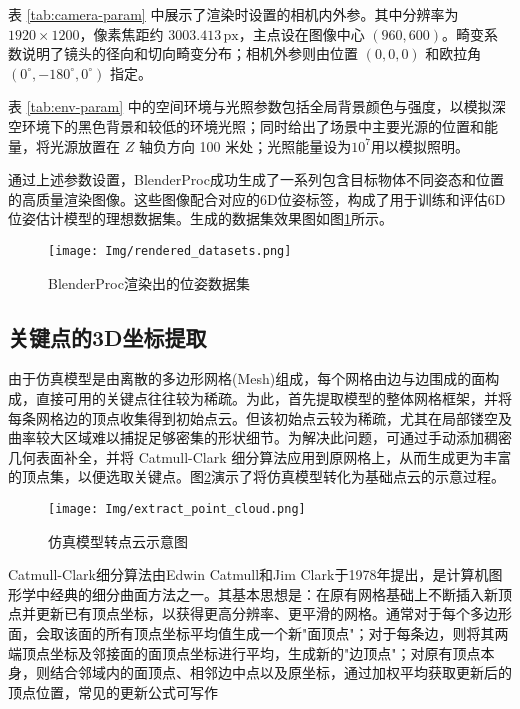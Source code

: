 表 \ref{tab:camera-param} 中展示了渲染时设置的相机内外参。其中分辨率为 $1920 \times 1200$，像素焦距约 $3003.413\,\mathrm{px}$，主点设在图像中心 $(960, 600)$。畸变系数说明了镜头的径向和切向畸变分布；相机外参则由位置 $(0,0,0)$ 和欧拉角 $(0^\circ,-180^\circ,0^\circ)$ 指定。

表 \ref{tab:env-param} 中的空间环境与光照参数包括全局背景颜色与强度，以模拟深空环境下的黑色背景和较低的环境光照；同时给出了场景中主要光源的位置和能量，将光源放置在 $Z$ 轴负方向 100 米处；光照能量设为$10^7$用以模拟照明。

通过上述参数设置，BlenderProc成功生成了一系列包含目标物体不同姿态和位置的高质量渲染图像。这些图像配合对应的6D位姿标签，构成了用于训练和评估6D位姿估计模型的理想数据集。生成的数据集效果图如图\ref{fig:rendered_datasets}所示。

\begin{figure}[htbp]
	\centering
	\texttt{[image: Img/rendered\_datasets.png]}
	\caption{BlenderProc渲染出的位姿数据集}
	\label{fig:rendered_datasets}
	\vspace{-3ex}
\end{figure}

\subsection{关键点的3D坐标提取}

由于仿真模型是由离散的多边形网格(Mesh)组成，每个网格由边与边围成的面构成，直接可用的关键点往往较为稀疏。为此，首先提取模型的整体网格框架，并将每条网格边的顶点收集得到初始点云。但该初始点云较为稀疏，尤其在局部镂空及曲率较大区域难以捕捉足够密集的形状细节。为解决此问题，可通过手动添加稠密几何表面补全，并将 Catmull-Clark 细分算法应用到原网格上，从而生成更为丰富的顶点集，以便选取关键点。图\ref{fig:model2pointcloud}演示了将仿真模型转化为基础点云的示意过程。

\begin{figure}[htbp]
	\centering
	\texttt{[image: Img/extract\_point\_cloud.png]}
	\caption{仿真模型转点云示意图}
	\label{fig:model2pointcloud}
	\vspace{-3ex}
\end{figure}



Catmull-Clark细分算法由Edwin Catmull和Jim Clark于1978年提出，是计算机图形学中经典的细分曲面方法之一。其基本思想是：在原有网格基础上不断插入新顶点并更新已有顶点坐标，以获得更高分辨率、更平滑的网格。通常对于每个多边形面，会取该面的所有顶点坐标平均值生成一个新"面顶点"；对于每条边，则将其两端顶点坐标及邻接面的面顶点坐标进行平均，生成新的"边顶点"；对原有顶点本身，则结合邻域内的面顶点、相邻边中点以及原坐标，通过加权平均获取更新后的顶点位置，常见的更新公式可写作

